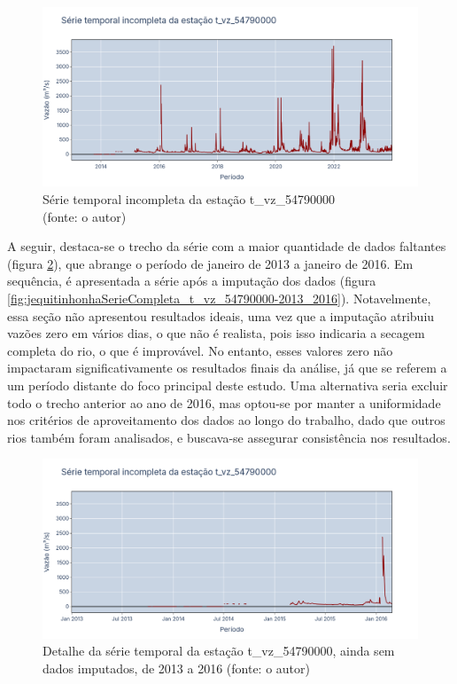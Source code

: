 \begin{figure}[!h]
	\centering
	\includegraphics[scale=0.25]{Figuras/jequiti/jequitinhonhaSerieIncompleta_t_vz_54790000.png}
	\caption{Série temporal incompleta da estação t\_vz\_54790000 \\(fonte: o autor)}
	\label{fig:jequitinhonhaSerieIncompleta_t_vz_54790000}
\end{figure}

A seguir, destaca-se o trecho da série com a maior quantidade de dados faltantes (figura \ref{fig:jequitinhonhaSerieIncompleta_t_vz_54790000-2013_2016}), que abrange o período de janeiro de 2013 a janeiro de 2016. Em sequência, é apresentada a série após a imputação dos dados (figura \ref{fig:jequitinhonhaSerieCompleta_t_vz_54790000-2013_2016}). Notavelmente, essa seção não apresentou resultados ideais, uma vez que a imputação atribuiu vazões zero em vários dias, o que não é realista, pois isso indicaria a secagem completa do rio, o que é improvável. No entanto, esses valores zero não impactaram significativamente os resultados finais da análise, já que se referem a um período distante do foco principal deste estudo. Uma alternativa seria excluir todo o trecho anterior ao ano de 2016, mas optou-se por manter a uniformidade nos critérios de aproveitamento dos dados ao longo do trabalho, dado que outros rios também foram analisados, e buscava-se assegurar consistência nos resultados.

\begin{figure}[!h]
	\centering
	\includegraphics[scale=0.25]{Figuras/jequiti/jequitinhonhaSerieIncompleta_t_vz_54790000-2013_2016.png}
	\caption{Detalhe da série temporal da estação t\_vz\_54790000, ainda sem dados imputados, de 2013 a 2016 (fonte: o autor)}
	\label{fig:jequitinhonhaSerieIncompleta_t_vz_54790000-2013_2016}
\end{figure}


